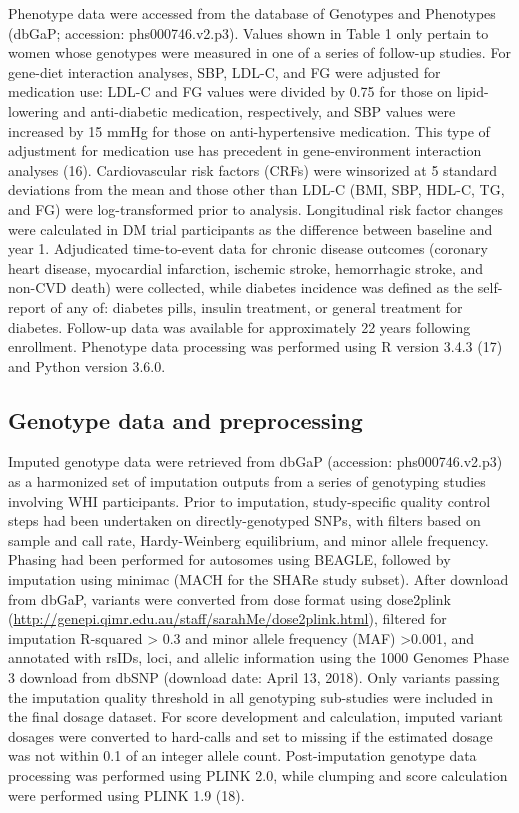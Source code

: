\documentclass[]{article}
\begin{document}
Phenotype data were accessed from the database of Genotypes and
Phenotypes (dbGaP; accession: phs000746.v2.p3). Values shown in Table 1
only pertain to women whose genotypes were measured in one of a series
of follow-up studies. For gene-diet interaction analyses, SBP, LDL-C,
and FG were adjusted for medication use: LDL-C and FG values were
divided by 0.75 for those on lipid-lowering and anti-diabetic
medication, respectively, and SBP values were increased by 15 mmHg for
those on anti-hypertensive medication. This type of adjustment for
medication use has precedent in gene-environment interaction analyses
(16). Cardiovascular risk factors (CRFs) were winsorized at 5 standard
deviations from the mean and those other than LDL-C (BMI, SBP, HDL-C,
TG, and FG) were log-transformed prior to analysis. Longitudinal risk
factor changes were calculated in DM trial participants as the
difference between baseline and year 1. Adjudicated time-to-event data
for chronic disease outcomes (coronary heart disease, myocardial
infarction, ischemic stroke, hemorrhagic stroke, and non-CVD death) were
collected, while diabetes incidence was defined as the self-report of
any of: diabetes pills, insulin treatment, or general treatment for
diabetes. Follow-up data was available for approximately 22 years
following enrollment. Phenotype data processing was performed using R
version 3.4.3 (17) and Python version 3.6.0.

\hypertarget{genotype-data-and-preprocessing}{%
\subsection{Genotype data and
preprocessing}\label{genotype-data-and-preprocessing}}

Imputed genotype data were retrieved from dbGaP (accession:
phs000746.v2.p3) as a harmonized set of imputation outputs from a series
of genotyping studies involving WHI participants. Prior to imputation,
study-specific quality control steps had been undertaken on
directly-genotyped SNPs, with filters based on sample and call rate,
Hardy-Weinberg equilibrium, and minor allele frequency. Phasing had been
performed for autosomes using BEAGLE, followed by imputation using
minimac (MACH for the SHARe study subset). After download from dbGaP,
variants were converted from dose format using dose2plink
(\url{http://genepi.qimr.edu.au/staff/sarahMe/dose2plink.html}),
filtered for imputation R-squared \textgreater{} 0.3 and minor allele
frequency (MAF) \textgreater{}0.001, and annotated with rsIDs, loci, and
allelic information using the 1000 Genomes Phase 3 download from dbSNP
(download date: April 13, 2018). Only variants passing the imputation
quality threshold in all genotyping sub-studies were included in the
final dosage dataset. For score development and calculation, imputed
variant dosages were converted to hard-calls and set to missing if the
estimated dosage was not within 0.1 of an integer allele count.
Post-imputation genotype data processing was performed using PLINK 2.0,
while clumping and score calculation were performed using PLINK 1.9
(18).
\end{document}
